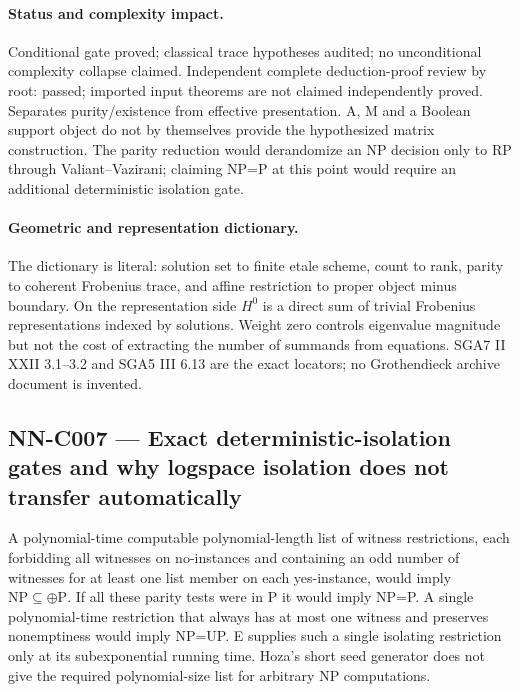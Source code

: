\paragraph{Status and complexity impact.}
Conditional gate proved; classical trace hypotheses audited; no unconditional complexity collapse claimed. Independent complete deduction-proof review by root: passed; imported input theorems are not claimed independently proved. Separates purity/existence from effective presentation. A, M and a Boolean support object do not by themselves provide the hypothesized matrix construction. The parity reduction would derandomize an NP decision only to RP through Valiant--Vazirani; claiming NP=P at this point would require an additional deterministic isolation gate.

\paragraph{Geometric and representation dictionary.}
The dictionary is literal: solution set to finite etale scheme, count to rank, parity to coherent Frobenius trace, and affine restriction to proper object minus boundary. On the representation side $H^0$ is a direct sum of trivial Frobenius representations indexed by solutions. Weight zero controls eigenvalue magnitude but not the cost of extracting the number of summands from equations. SGA7 II XXII 3.1--3.2 and SGA5 III 6.13 are the exact locators; no Grothendieck archive document is invented.

\subsection{NN-C007 --- Exact deterministic-isolation gates and why logspace isolation does not transfer automatically}
\begin{proposition}[NN-C007]
A polynomial-time computable polynomial-length list of witness restrictions, each forbidding all witnesses on no-instances and containing an odd number of witnesses for at least one list member on each yes-instance, would imply $\mathrm{NP}\subseteq\oplus\mathrm P$. If all these parity tests were in P it would imply NP=P. A single polynomial-time restriction that always has at most one witness and preserves nonemptiness would imply NP=UP. E supplies such a single isolating restriction only at its subexponential running time. Hoza's short seed generator does not give the required polynomial-size list for arbitrary NP computations.
\end{proposition}
